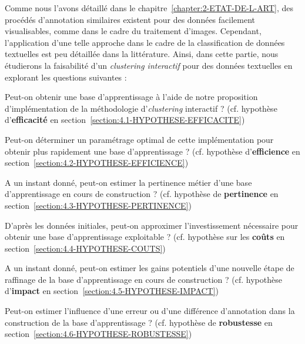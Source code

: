 	Comme nous l'avons détaillé dans le chapitre~\ref{chapter:2-ETAT-DE-L-ART}, des procédés d'annotation similaires existent pour des données facilement visualisables, comme dans le cadre du traitement d'images. Cependant, l'application d'une telle approche dans le cadre de la classification de données textuelles est peu détaillée dans la littérature. Ainsi, dans cette partie, nous étudierons la faisabilité d'un \textit{clustering interactif} pour des données textuelles en explorant les questions suivantes :
	\begin{todolist}
		\item Peut-on obtenir une base d'apprentissage à l'aide de notre proposition d'implémentation de la méthodologie d'\textit{clustering} interactif ? (cf. hypothèse d'\textbf{efficacité} en section~\ref{section:4.1-HYPOTHESE-EFFICACITE})
		\item Peut-on déterminer un paramétrage optimal de cette implémentation pour obtenir plus rapidement une base d'apprentissage ? (cf. hypothèse d'\textbf{efficience} en section~\ref{section:4.2-HYPOTHESE-EFFICIENCE})
		\item A un instant donné, peut-on estimer la pertinence métier d'une base d'apprentissage en cours de construction ? (cf. hypothèse de \textbf{pertinence} en section~\ref{section:4.3-HYPOTHESE-PERTINENCE})
		\item D'après les données initiales, peut-on approximer l'investissement nécessaire pour obtenir une base d'apprentissage exploitable ? (cf. hypothèse sur les \textbf{coûts} en section~\ref{section:4.4-HYPOTHESE-COUTS})
		\item A un instant donné, peut-on estimer les gains potentiels d'une nouvelle étape de raffinage de la base d'apprentissage en cours de construction ? (cf. hypothèse d'\textbf{impact} en section~\ref{section:4.5-HYPOTHESE-IMPACT})
		\item Peut-on estimer l'influence d'une erreur ou d'une différence d'annotation dans la construction de la base d'apprentissage ? (cf. hypothèse de \textbf{robustesse} en section~\ref{section:4.6-HYPOTHESE-ROBUSTESSE})
	\end{todolist}
	
